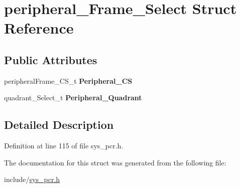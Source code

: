 \hypertarget{structperipheral__Frame__Select}{}\section{peripheral\+\_\+\+Frame\+\_\+\+Select Struct Reference}
\label{structperipheral__Frame__Select}
\subsection*{Public Attributes}
\begin{DoxyCompactItemize}
\item 
\mbox{\label{structperipheral__Frame__Select_a0ca74bee7eb11beef46463df17df0e44}} 
peripheral\+Frame\+\_\+\+C\+S\+\_\+t {\bfseries Peripheral\+\_\+\+CS}
\item 
\mbox{\label{structperipheral__Frame__Select_a0b9fc9ad1ec79cef4de3106c98a63c01}} 
quadrant\+\_\+\+Select\+\_\+t {\bfseries Peripheral\+\_\+\+Quadrant}
\end{DoxyCompactItemize}


\subsection{Detailed Description}


Definition at line 115 of file sys\+\_\+pcr.\+h.



The documentation for this struct was generated from the following file\+:\begin{DoxyCompactItemize}
\item 
include/\mbox{\hyperlink{sys__pcr_8h}{sys\+\_\+pcr.\+h}}\end{DoxyCompactItemize}
